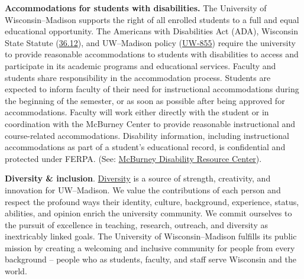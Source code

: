 \documentclass[11pt]{article}
\begin{document}
\textbf{Accommodations for students with disabilities.} The University of Wisconsin--Madison supports the right of all enrolled students to a full and equal educational opportunity. 
The Americans with Disabilities Act (ADA), Wisconsin State Statute (\href{https://docs.legis.wisconsin.gov/statutes/statutes/36/12}{36.12}), and UW--Madison policy (\href{https://policy.wisc.edu/library/UW-855}{UW-855}) require the university to provide reasonable accommodations to students with disabilities to access and participate in its academic programs and educational services. 
Faculty and students share responsibility in the accommodation process. 
Students are expected to inform faculty of their need for instructional accommodations during the beginning of the semester, or as soon as possible after being approved for accommodations. 
Faculty will work either directly with the student or in coordination with the McBurney Center to provide reasonable instructional and course-related accommodations. Disability information, including instructional accommodations as part of a student's educational record, is confidential and protected under FERPA. (See: \href{https://mcburney.wisc.edu/}{McBurney Disability Resource Center}).

\textbf{Diversity \& inclusion}. \href{https://diversity.wisc.edu}{Diversity} is a source of strength, creativity, and innovation for UW--Madison. We value the contributions of each person and respect the profound ways their identity, culture, background, experience, status, abilities, and opinion enrich the university community. We commit ourselves to the pursuit of excellence in teaching, research, outreach, and diversity as inextricably linked goals. The University of Wisconsin--Madison fulfills its public mission by creating a welcoming and inclusive community for people from every background -- people who as students, faculty, and staff serve Wisconsin and the world. 
\end{document}
